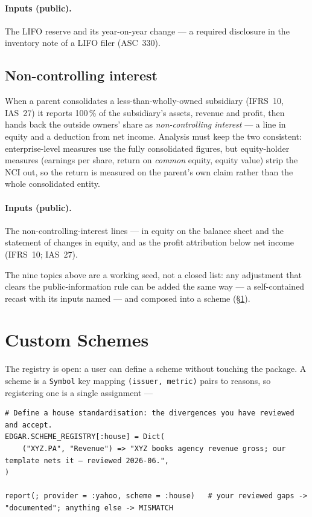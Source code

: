 \documentclass[11pt,a4paper]{report}
\begin{document}
\paragraph{Inputs (public).} The LIFO reserve and its year-on-year change --- a required disclosure in the
inventory note of a LIFO filer (ASC~330).

\subsection{Non-controlling interest}
\label{sec:topics-nci}
When a parent consolidates a less-than-wholly-owned subsidiary (IFRS~10, IAS~27) it reports 100\,\% of the
subsidiary's assets, revenue and profit, then hands back the outside owners' share as \emph{non-controlling
interest} --- a line in equity and a deduction from net income. Analysis must keep the two consistent:
enterprise-level measures use the fully consolidated figures, but equity-holder measures (earnings per share,
return on \emph{common} equity, equity value) strip the NCI out, so the return is measured on the parent's own
claim rather than the whole consolidated entity.

\paragraph{Inputs (public).} The non-controlling-interest lines --- in equity on the balance sheet and the
statement of changes in equity, and as the profit attribution below net income (IFRS~10; IAS~27).

\medskip
\noindent The nine topics above are a working seed, not a closed list: any adjustment that clears the
public-information rule can be added the same way --- a self-contained recast with its inputs named --- and
composed into a scheme (\S\ref{sec:schemes-custom}).

\section{Custom Schemes}
\label{sec:schemes-custom}

The registry is open: a user can define a scheme without touching the package. A scheme is a \texttt{Symbol}
key mapping \texttt{(issuer, metric)} pairs to reasons, so registering one is a single assignment ---

\begin{lstlisting}
# Define a house standardisation: the divergences you have reviewed and accept.
EDGAR.SCHEME_REGISTRY[:house] = Dict(
    ("XYZ.PA", "Revenue") => "XYZ books agency revenue gross; our template nets it — reviewed 2026-06.",
)

report(; provider = :yahoo, scheme = :house)   # your reviewed gaps -> "documented"; anything else -> MISMATCH
\end{lstlisting}
\end{document}

